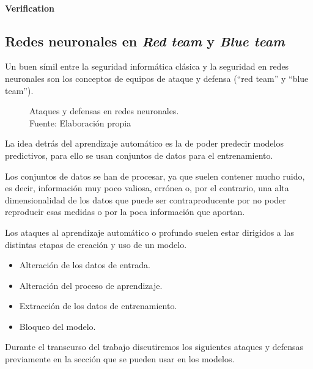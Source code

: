 \paragraph{Verification}



\subsection{Redes neuronales en \textit{Red team} y \textit{Blue team}}

Un buen símil entre la seguridad informática clásica y la seguridad en redes neuronales son los conceptos de equipos de ataque y defensa (``red team'' y ``blue team'').

\begin{figure}[H]
    \centering
    \centerline{}
    \caption{Ataques y defensas en redes neuronales.\\Fuente: Elaboración propia}
    \label{fig:art-for-red-and-blue-teams}
\end{figure}

La idea detrás del aprendizaje automático es la de poder predecir modelos predictivos, para ello se usan conjuntos de datos para el entrenamiento.

Los conjuntos de datos se han de procesar, ya que suelen contener mucho ruido, es decir, información muy poco valiosa, errónea o, por el contrario, una alta dimensionalidad de los datos que puede ser contraproducente por no poder reproducir esas medidas o por la poca información que aportan.

Los ataques al aprendizaje automático o profundo suelen estar dirigidos a las distintas etapas de creación y uso de un modelo.

\begin{itemize}
    \item Alteración de los datos de entrada.
    \item Alteración del proceso de aprendizaje.
    \item Extracción de los datos de entrenamiento.
    \item Bloqueo del modelo.
\end{itemize}

Durante el transcurso del trabajo discutiremos los siguientes ataques y defensas previamente en la sección  que se pueden usar en los modelos.

